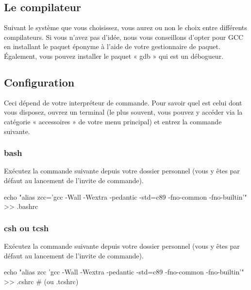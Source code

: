 \subsection{ Le compilateur}\label{le-compilateur}

Suivant le système que vous choisissez, vous aurez ou non le choix
entre différents compilateurs. Si vous n'avez pas d'idée, nous vous
conseillons d'opter pour GCC en installant le paquet éponyme à l'aide
de votre gestionnaire de paquet. Également, vous pouvez installer le
paquet « gdb » qui est un débogueur.

\subsection{Configuration}\label{configuration-1}

Ceci dépend de votre interpréteur de commande. Pour savoir quel est
celui dont vous disposez, ouvrez un terminal (le plus souvent, vous
pouvez y accéder via la catégorie « accessoires » de votre menu
principal) et entrez la commande suivante.



\subsubsection{bash}\label{bash}

Exécutez la commande suivante depuis votre dossier personnel (vous y
êtes par défaut au lancement de l'invite de commande).

\begin{bash}
  echo "alias zcc='gcc -Wall -Wextra -pedantic -std=c89 -fno-common -fno-builtin'"
  >> .bashrc
\end{bash}


\subsubsection{csh ou tcsh}\label{csh-ou-tcsh}

Exécutez la commande suivante depuis votre dossier personnel (vous y
êtes par défaut au lancement de l'invite de commande).

\begin{bash}
  echo "alias zcc 'gcc -Wall -Wextra -pedantic -std=c89 -fno-common -fno-builtin'"
  >> .cshrc # (ou .tcshrc)
\end{bash}


